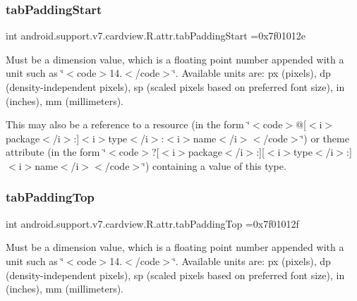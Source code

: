 \subsubsection{\texorpdfstring{tab\+Padding\+Start}{tabPaddingStart}}
{\footnotesize\ttfamily int android.\+support.\+v7.\+cardview.\+R.\+attr.\+tab\+Padding\+Start =0x7f01012e\hspace{0.3cm}{\ttfamily [static]}}

Must be a dimension value, which is a floating point number appended with a unit such as \char`\"{}$<$code$>$14.\+5sp$<$/code$>$\char`\"{}. Available units are\+: px (pixels), dp (density-\/independent pixels), sp (scaled pixels based on preferred font size), in (inches), mm (millimeters). 

This may also be a reference to a resource (in the form \char`\"{}$<$code$>$@\mbox{[}$<$i$>$package$<$/i$>$\+:\mbox{]}$<$i$>$type$<$/i$>$\+:$<$i$>$name$<$/i$>$$<$/code$>$\char`\"{}) or theme attribute (in the form \char`\"{}$<$code$>$?\mbox{[}$<$i$>$package$<$/i$>$\+:\mbox{]}\mbox{[}$<$i$>$type$<$/i$>$\+:\mbox{]}$<$i$>$name$<$/i$>$$<$/code$>$\char`\"{}) containing a value of this type. \mbox{\label{classandroid_1_1support_1_1v7_1_1cardview_1_1R_1_1attr_affa888541a738a70bd00ff1842fcdf48}} 
\subsubsection{\texorpdfstring{tab\+Padding\+Top}{tabPaddingTop}}
{\footnotesize\ttfamily int android.\+support.\+v7.\+cardview.\+R.\+attr.\+tab\+Padding\+Top =0x7f01012f\hspace{0.3cm}{\ttfamily [static]}}

Must be a dimension value, which is a floating point number appended with a unit such as \char`\"{}$<$code$>$14.\+5sp$<$/code$>$\char`\"{}. Available units are\+: px (pixels), dp (density-\/independent pixels), sp (scaled pixels based on preferred font size), in (inches), mm (millimeters). 

